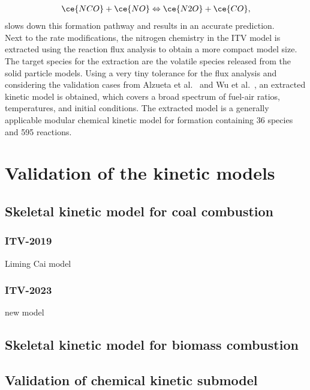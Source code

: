 \begin{refsection}
\begin{align}
\ce{NCO}+\ce{NO} \Leftrightarrow \ce{N2O}+\ce{CO},
\end{align}
slows down this  formation pathway and results in an accurate  prediction.
\\
Next to the rate modifications, the nitrogen chemistry in the ITV model is extracted using the reaction flux analysis to obtain a more compact model size. The target species for the extraction are the volatile species released from the solid particle models. Using a very tiny tolerance for the flux analysis and considering the validation cases from Alzueta et al.~\cite{Alzueta2002} and Wu et al.~\cite{Wu2019, Wu2022}, an extracted kinetic model is obtained, which covers a broad spectrum of fuel-air ratios, temperatures, and initial conditions. The extracted model is a generally applicable modular chemical kinetic model for  formation containing 36 species and 595 reactions.



\section{Validation of the kinetic models}
 
\subsection{Skeletal kinetic model for coal combustion}
 
\subsubsection{ITV-2019}
Liming Cai model
 
\subsubsection{ITV-2023}
new model

\subsection{Skeletal kinetic model for biomass combustion}
 
\subsection{Validation of  chemical kinetic submodel}






\Acknowledgement

\renewcommand{\bibname}{References}
\printbibliography[heading=subbibliography]

\end{refsection}
